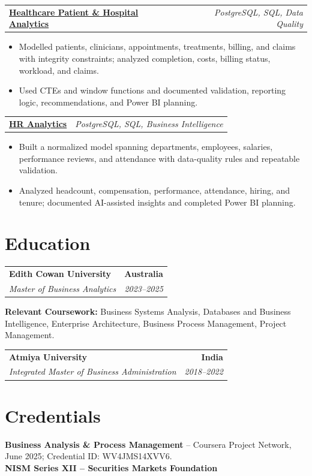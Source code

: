 \documentclass[letterpaper,10pt]{article}
\makeatletter
\newcommand{\role}[4]{%
  \begin{tabularx}{\textwidth}{@{}Xr@{}}
    \textbf{#1} & \textbf{#2} \\
    \textit{#3} & \textit{#4}
  \end{tabularx}\vspace{-1pt}
}
\newcommand{\project}[2]{%
  \begin{tabularx}{\textwidth}{@{}Xr@{}}
    \textbf{#1} & \textit{#2}
  \end{tabularx}\vspace{-1pt}
}
\makeatother
\begin{document}
\project{\href{https://github.com/jainalimehta/Healthcare-Analytics}{Healthcare Patient \& Hospital Analytics}}{PostgreSQL, SQL, Data Quality}
\begin{itemize}
  \item Modelled patients, clinicians, appointments, treatments, billing, and claims with integrity constraints; analyzed completion, costs, billing status, workload, and claims.
  \item Used CTEs and window functions and documented validation, reporting logic, recommendations, and Power BI planning.
\end{itemize}
\vspace{1pt}

\project{\href{https://github.com/jainalimehta/HR-Analytics}{HR Analytics}}{PostgreSQL, SQL, Business Intelligence}
\begin{itemize}
  \item Built a normalized model spanning departments, employees, salaries, performance reviews, and attendance with data-quality rules and repeatable validation.
  \item Analyzed headcount, compensation, performance, attendance, hiring, and tenure; documented AI-assisted insights and completed Power BI planning.
\end{itemize}

\section{Education}
\role{Edith Cowan University}{Australia}{Master of Business Analytics}{2023--2025}
\small\textbf{Relevant Coursework:} Business Systems Analysis, Databases and Business Intelligence, Enterprise Architecture, Business Process Management, Project Management.\\[2pt]
\role{Atmiya University}{India}{Integrated Master of Business Administration}{2018--2022}

\section{Credentials}
\small\textbf{Business Analysis \& Process Management} -- Coursera Project Network, June 2025; Credential ID: WV4JMS14XVV6.\\[-0.2pt]
\small\textbf{NISM Series XII -- Securities Markets Foundation}
\end{document}
